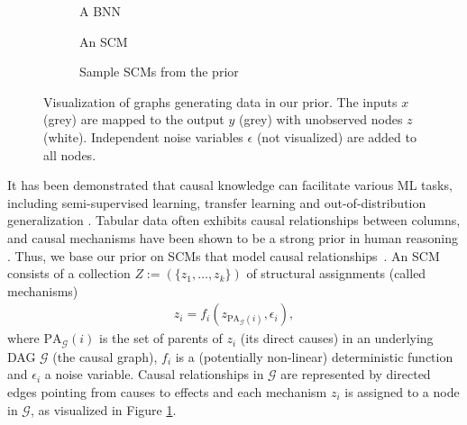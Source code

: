 \documentclass{article}
\begin{document}
\label{sec:causal prior}
%
%
\begin{figure}[t]
     \centering
     \begin{subfigure}[b]{0.3\textwidth}
         \centering
         
         \caption{A BNN}
     \end{subfigure}
     \hfill
     \begin{subfigure}[b]{0.3\textwidth}
         \centering
         
         \caption{An SCM}
     \end{subfigure}
     \hfill
     \begin{subfigure}[b]{0.3\textwidth}
         \centering
         
         \caption{Sample SCMs from the prior}
     \end{subfigure}
        \caption{Visualization of graphs generating data in our prior. The inputs $x$ (grey) are mapped to the output $y$ (grey) with unobserved nodes $z$ (white). Independent noise variables $\epsilon$ (not visualized) are added to all nodes.}
        \label{fig:structural_graphs}
\end{figure}
%
It has been demonstrated that causal knowledge can facilitate various ML tasks, including semi-supervised learning, transfer learning and out-of-distribution generalization \citep{scholkopf2012causal, NEURIPS2019_2172fde4, rotenh2018}.
Tabular data often exhibits causal relationships between columns, and causal mechanisms have been shown to be a strong prior in human reasoning \citep{waldmann2013causal, explanatoryvalues}.
Thus, we base our \methodname{} prior on SCMs that model causal relationships~\citep{pearl_2009, causalinferencelearningbook}.
An SCM %
consists of a collection $Z := (\{z_1, \dots, z_k\})$ of structural assignments (called mechanisms)
\begin{align}
    z_i = f_i(z_{\text{PA}_{\mathcal{G}}(i)}, \epsilon_i),
\end{align}
where $\text{PA}_{\mathcal{G}}(i)$ is the set of parents of $z_i$ (its direct causes) in an underlying DAG $\mathcal{G}$ (the causal graph), $f_i$ is a (potentially non-linear) deterministic function and $\epsilon_i$ a noise variable.
Causal relationships in $\mathcal{G}$ are represented by directed edges pointing from causes to effects and each mechanism $z_i$ is assigned to a node in $\mathcal{G}$, as visualized in Figure \ref{fig:structural_graphs}.
\end{document}
